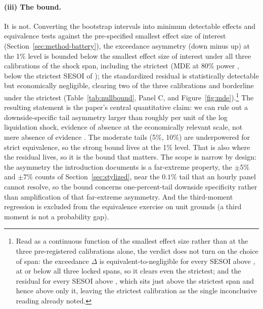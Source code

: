 \paragraph{(iii) The bound.}
It is not. Converting the bootstrap intervals into minimum detectable
effects and equivalence tests \citep{lakens2017,riesthuis2024} against the
pre-specified smallest effect size of interest
(Section~\ref{sec:method-battery}), the exceedance asymmetry (down minus up) at the 1\%
level is bounded below the smallest effect size of interest under all three
calibrations of the shock span, including the strictest (MDE at 80\% power
\MdeEightyExc{}, below the strictest SESOI of \SesoiStrict); the
standardized residual is statistically detectable but economically
negligible, clearing two of the three calibrations and borderline under the
strictest (Table~\ref{tab:nullbound}, Panel C, and Figure~\ref{fig:mde}).\footnote{Read as a continuous function of the
smallest effect size rather than at the three pre-registered calibrations
alone, the verdict does not turn on the choice of span: the exceedance
$\Delta$ is equivalent-to-negligible for every SESOI above \SesoiEquivExc{},
at or below all three locked spans, so it clears even the strictest;
and the residual for every SESOI above \SesoiEquivSkew{}, which sits just
above the strictest span and hence above only it, leaving the strictest
calibration as the single inconclusive reading already noted.} The resulting
statement is the paper's central
quantitative claim: we can rule out a downside-specific tail
asymmetry larger than roughly \MdeEightyExc{} per unit of the log
liquidation shock, evidence of absence at the economically relevant
scale, not mere absence of evidence \citep{altman1995,ioannidis2017}. The moderate tails (5\%, 10\%) are underpowered for
strict equivalence, so the strong bound lives at the 1\% level. That is
also where the residual lives, so it is the bound that matters. The scope is narrow by design: the asymmetry the introduction documents is a far-extreme property, the $\pm 5\%$ and $\pm 7\%$ counts of Section~\ref{sec:stylized}, near the $0.1\%$ tail that an hourly panel cannot resolve, so the bound concerns one-percent-tail downside specificity rather than amplification of that far-extreme asymmetry. And the
third-moment regression is excluded from the equivalence exercise on
unit grounds (a third moment is not a probability gap).

